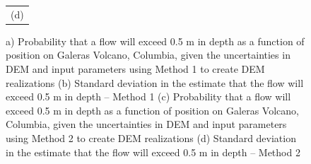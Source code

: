 \documentclass[12pt]{article}
\begin{document}
\begin{figure}[H]
\begin{minipage}{0.6\textwidth}
\begin{tabular}{c}
        (d)
        \end{tabular}
    \end{minipage} 
    \caption{a) Probability that a flow will exceed 0.5 m in depth as
      a function of position on Galeras Volcano, Columbia, given the
      uncertainties in DEM and input parameters using Method 1 to
      create DEM realizations (b) Standard deviation in the estimate
      that the flow will exceed 0.5 m in depth -- Method 1 (c)
      Probability that a flow will exceed 0.5 m in depth as a function
      of position on Galeras Volcano, Columbia, given the
      uncertainties in DEM and input parameters using Method 2 to
      create DEM realizations (d) Standard deviation in the estimate
      that the flow will exceed 0.5 m in depth -- Method 2}
\label{fig3}  
\end{figure}
\end{document}
